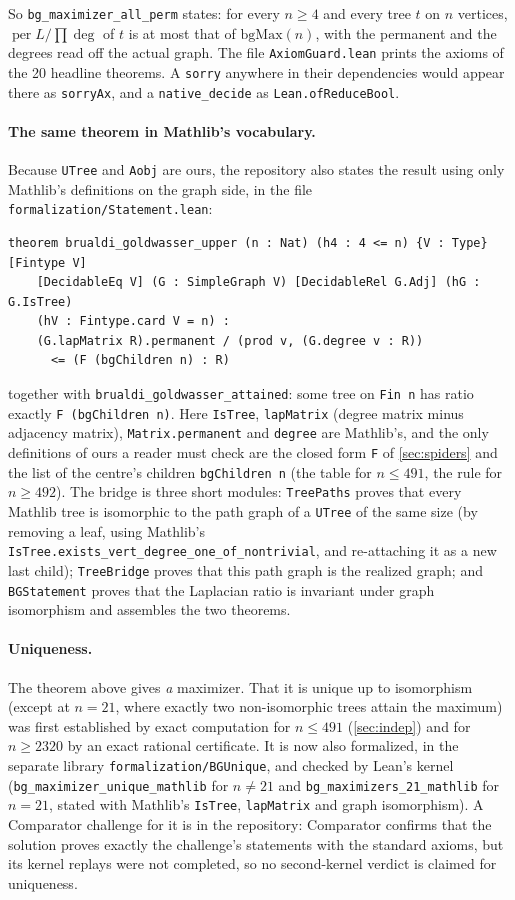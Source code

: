 \documentclass[11pt]{article}
\theoremstyle{definition}
\newcommand{\per}{\operatorname{per}}
\renewcommand{\deg}{\operatorname{deg}}
\newcommand{\lean}[1]{\texttt{#1}}
\begin{document}
So \lean{bg\_maximizer\_all\_perm} states: for every $n\ge4$ and every tree $t$ on $n$ vertices,
$\per L/\prod\deg$ of $t$ is at most that of $\mathrm{bgMax}(n)$, with the permanent and the degrees read
off the actual graph. The file \lean{AxiomGuard.lean} prints the axioms of the 20 headline theorems. A
\lean{sorry} anywhere in their dependencies would appear there as \lean{sorryAx}, and a
\lean{native\_decide} as \lean{Lean.ofReduceBool}.

\paragraph{The same theorem in Mathlib's vocabulary.} Because \lean{UTree} and \lean{Aobj} are ours,
the repository also states the result using only Mathlib's definitions on the graph side, in the file
\texttt{formalization/Statement.lean}:
\begin{verbatim}
theorem brualdi_goldwasser_upper (n : Nat) (h4 : 4 <= n) {V : Type} [Fintype V]
    [DecidableEq V] (G : SimpleGraph V) [DecidableRel G.Adj] (hG : G.IsTree)
    (hV : Fintype.card V = n) :
    (G.lapMatrix R).permanent / (prod v, (G.degree v : R))
      <= (F (bgChildren n) : R)
\end{verbatim}
together with \lean{brualdi\_goldwasser\_attained}: some tree on \lean{Fin n} has ratio exactly
\lean{F (bgChildren n)}. Here \lean{IsTree}, \lean{lapMatrix} (degree matrix minus adjacency matrix),
\lean{Matrix.permanent} and \lean{degree} are Mathlib's, and the only definitions of ours a reader must
check are the closed form \lean{F} of \cref{sec:spiders} and the list of the centre's children
\lean{bgChildren n} (the table for $n\le491$, the rule for $n\ge492$). The bridge is three short
modules: \lean{TreePaths} proves that every Mathlib tree is isomorphic to the path graph of a
\lean{UTree} of the same size (by removing a leaf, using Mathlib's
\lean{IsTree.exists\_vert\_degree\_one\_of\_nontrivial}, and re-attaching it as a new last child);
\lean{TreeBridge} proves that this path graph is the realized graph; and \lean{BGStatement} proves that the
Laplacian ratio is invariant under graph isomorphism and assembles the two theorems.

\paragraph{Uniqueness.} The theorem above gives \emph{a} maximizer. That it is unique up to isomorphism
(except at $n=21$, where exactly two non-isomorphic trees attain the maximum) was first established by
exact computation for $n\le491$ (\cref{sec:indep}) and for $n\ge2320$ by an exact rational certificate. It
is now also formalized, in the separate library \texttt{formalization/BGUnique}, and checked by Lean's
kernel (\lean{bg\_maximizer\_unique\_mathlib} for $n\ne21$ and \lean{bg\_maximizers\_21\_mathlib} for
$n=21$, stated with Mathlib's \lean{IsTree}, \lean{lapMatrix} and graph isomorphism). A Comparator
challenge for it is in the repository: Comparator confirms that the solution proves exactly the
challenge's statements with the standard axioms, but its kernel replays were not completed, so no
second-kernel verdict is claimed for uniqueness.
\end{document}
